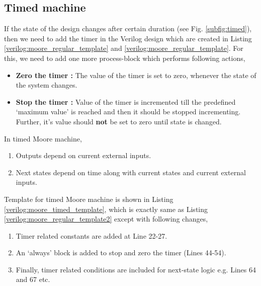 \subsection{Timed machine}
If the state of the design changes after certain duration (see Fig. \ref{subfig:timed}), then we need to add the timer in the Verilog design which are created in Listing \ref{verilog:moore_regular_template} and \ref{verilog:moore_regular_template}. For this, we need to add one more process-block which performs following actions, 
\begin{itemize}
	\item \textbf{Zero the timer : } The value of the timer is set to zero, whenever the state of the system changes. 
	\item \textbf{Stop the timer : } Value of the timer is incremented till the predefined `maximum value' is reached and then it should be stopped incrementing. Further, it's value should \textbf{not} be set to zero until state is changed. 
\end{itemize}

\begin{noNumBox}
	In timed Moore machine, 
	\begin{enumerate}
		\item Outputs depend on current external inputs. 
		\item Next states depend on time along with current states and current external inputs.
	\end{enumerate}
\end{noNumBox}
Template for timed Moore machine is shown in Listing \ref{verilog:moore_timed_template}, which is exactly same as Listing \ref{verilog:moore_regular_template2} except with following changes, 
\begin{enumerate}
	\item Timer related constants are added at Line 22-27.
	\item An `always' block is added to stop and zero the timer (Lines 44-54). 
	\item Finally, timer related conditions are included for next-state logic e.g.  Lines 64 and 67 etc.
\end{enumerate}



